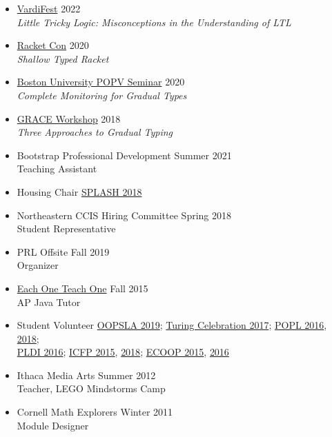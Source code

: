 \documentclass[11pt]{article}
\begin{document}
\begin{itemize}
  \item
    \href{https://vardifest.github.io}{VardiFest} \hfill 2022\\
    \emph{Little Tricky Logic: Misconceptions in the Understanding of LTL}
  \item
    \href{https://con.racket-lang.org/2020}{Racket Con} \hfill 2020\\
    \emph{Shallow Typed Racket}
  \item
    \href{https://www.bu.edu/cs/research/popv/seminar/}{Boston University POPV Seminar} \hfill {2020}\\
    \emph{Complete Monitoring for Gradual Types}
  \item
    \href{https://2018.splashcon.org/track/grace-2018-papers}{GRACE Workshop} \hfill 2018\\
    \emph{Three Approaches to Gradual Typing}
\end{itemize}


\begin{itemize}
  \item {Bootstrap Professional Development} \hfill {Summer 2021}\\
        Teaching Assistant
  \item {Housing Chair} \hfill \href{https://2018.splashcon.org/committee/splash-2018-organizing-committee}{SPLASH 2018}
  \item {Northeastern CCIS Hiring Committee} \hfill {Spring 2018}\\
    Student Representative
  \item {PRL Offsite} \hfill {Fall 2019}\\
    Organizer
  \item \href{https://www.eachoneteachone.is}{Each One Teach One} \hfill {Fall 2015}\\
    AP Java Tutor
  \item {Student Volunteer} \hfill \href{https://2019.splashcon.org/}{OOPSLA 2019}; \href{https://www.acm.org/turing-award-50/conference}{Turing Celebration 2017}; \href{http://conf.researchr.org/home/POPL-2016}{POPL 2016}, \href{http://conf.researchr.org/home/POPL-2018}{2018};\\
    {\hbox{}\hfill{} \href{http://conf.researchr.org/home/PLDI-2016}{PLDI 2016}; \href{http://icfpconference.org/icfp2015/}{ICFP 2015}, \href{https://icfp18.sigplan.org/committee/icfp-2018-organizing-committee}{2018}; \href{http://2015.ecoop.org/}{ECOOP 2015}, \href{http://2016.ecoop.org/}{2016}}
  \item {Ithaca Media Arts} \hfill {Summer 2012}\\
    Teacher, LEGO Mindstorms Camp
  \item {Cornell Math Explorers} \hfill {Winter 2011}\\
    Module Designer

\end{itemize}
\end{document}

